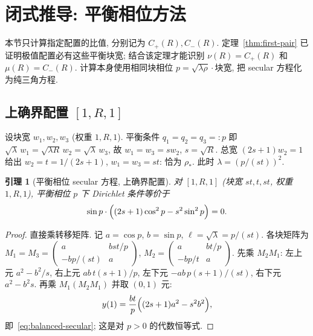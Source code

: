 \documentclass[UTF8]{ctexart}
\newtheorem{lemma}[theorem]{引理}
\begin{document}
\section{闭式推导: 平衡相位方法}\label{sec:balanced}

本节只计算指定配置的比值, 分别记为 $C_+(R),C_-(R)$.
定理~\ref{thm:first-pair} 已证明极值配置必有这些平衡块宽; 结合该定理才能识别
$\nu(R)=C_+(R)$ 和 $\mu(R)=C_-(R)$.
计算本身使用相同块相位 $p=\sqrt{\lambda\rho}\cdot\text{块宽}$,
把 secular 方程化为纯三角方程.

\subsection{上确界配置 \texorpdfstring{$[1,R,1]$}{[1,R,1]}}

设块宽 $w_1, w_2, w_3$ (权重 $1, R, 1$). 平衡条件 $q_1 = q_2 = q_3 =: p$ 即
$\sqrt{\lambda}\,w_1 = \sqrt{\lambda R}\,w_2 = \sqrt{\lambda}\,w_3$, 故 $w_1 = w_3 = s w_2$,
$s = \sqrt{R}$. 总宽 $(2s+1)w_2 = 1$ 给出 $w_2 = t = 1/(2s+1)$, $w_1 = w_3 = st$:
恰为 $\rho_*$. 此时 $\lambda = (p/(st))^2$.

\begin{lemma}[平衡相位 secular 方程, 上确界配置]
对 $[1,R,1]$ (块宽 $st, t, st$, 权重 $1, R, 1$), 平衡相位 $p$ 下 Dirichlet 条件等价于
\begin{equation}
	\sin p \cdot \Bigl( (2s+1)\cos^2 p - s^2 \sin^2 p \Bigr) = 0 .
 \label{eq:balanced-secular}
\end{equation}
\end{lemma}

\begin{proof}
直接乘转移矩阵. 记 $a = \cos p$, $b = \sin p$, $\ell = \sqrt{\lambda} = p/(st)$.
各块矩阵为 $M_1 = M_3 = \begin{pmatrix} a & bst/p \\ -bp/(st) & a \end{pmatrix}$,
$M_2 = \begin{pmatrix} a & bt/p \\ -bp/t & a \end{pmatrix}$.
先乘 $M_2 M_1$: 左上元 $a^2 - b^2/s$, 右上元 $ab\,t(s+1)/p$,
左下元 $-ab\,p(s+1)/(st)$, 右下元 $a^2 - b^2 s$. 再乘 $M_1 (M_2 M_1)$ 并取 $(0,1)$ 元:
\begin{equation}
	y(1) = \frac{b t}{p}\Bigl( (2s+1)a^2 - s^2 b^2 \Bigr),
\end{equation}
即~\eqref{eq:balanced-secular}; 这是对 $p>0$ 的代数恒等式.
\end{proof}
\end{document}
